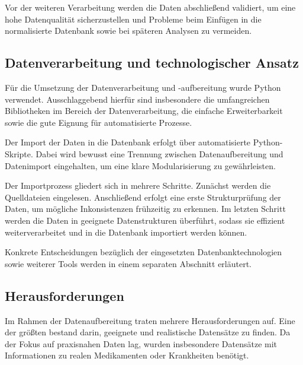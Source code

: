Vor der weiteren Verarbeitung werden die Daten abschließend validiert, um eine hohe Datenqualität sicherzustellen 
und Probleme beim Einfügen in die normalisierte Datenbank sowie bei späteren Analysen zu vermeiden.
\subsection{Datenverarbeitung und technologischer Ansatz}

Für die Umsetzung der Datenverarbeitung und -aufbereitung wurde Python verwendet. 
Ausschlaggebend hierfür sind insbesondere die umfangreichen Bibliotheken im Bereich 
der Datenverarbeitung, die einfache Erweiterbarkeit sowie die gute Eignung für 
automatisierte Prozesse.

Der Import der Daten in die Datenbank erfolgt über automatisierte Python-Skripte. 
Dabei wird bewusst eine Trennung zwischen Datenaufbereitung und Datenimport 
eingehalten, um eine klare Modularisierung zu gewährleisten.

Der Importprozess gliedert sich in mehrere Schritte. Zunächst werden die 
Quelldateien eingelesen. Anschließend erfolgt eine erste Strukturprüfung der Daten, 
um mögliche Inkonsistenzen frühzeitig zu erkennen. Im letzten Schritt werden die 
Daten in geeignete Datenstrukturen überführt, sodass sie effizient weiterverarbeitet 
und in die Datenbank importiert werden können.

Konkrete Entscheidungen bezüglich der eingesetzten Datenbanktechnologien sowie 
weiterer Tools werden in einem separaten Abschnitt erläutert.

\subsection{Herausforderungen}
Im Rahmen der Datenaufbereitung traten mehrere Herausforderungen auf. Eine der größten bestand darin, 
geeignete und realistische Datensätze zu finden. Da der Fokus auf praxisnahen Daten lag, wurden insbesondere 
Datensätze mit Informationen zu realen Medikamenten oder Krankheiten benötigt.


